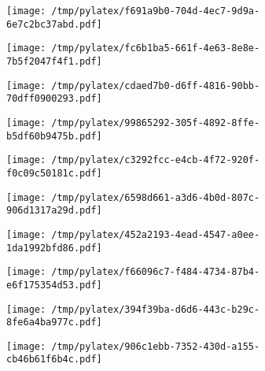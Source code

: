 \documentclass{article}
\begin{document}
\begin{figure}[htbp]
\begin{subfigure}[b]{.3\linewidth}
\texttt{[image: /tmp/pylatex/f691a9b0-704d-4ec7-9d9a-6e7c2bc37abd.pdf]}
\end{subfigure}
\begin{subfigure}[b]{.3\linewidth}
\texttt{[image: /tmp/pylatex/fc6b1ba5-661f-4e63-8e8e-7b5f2047f4f1.pdf]}
\end{subfigure}
\begin{subfigure}[b]{.3\linewidth}
\texttt{[image: /tmp/pylatex/cdaed7b0-d6ff-4816-90bb-70dff0900293.pdf]}
\end{subfigure}
\begin{subfigure}[b]{.3\linewidth}
\texttt{[image: /tmp/pylatex/99865292-305f-4892-8ffe-b5df60b9475b.pdf]}
\end{subfigure}
\begin{subfigure}[b]{.3\linewidth}
\texttt{[image: /tmp/pylatex/c3292fcc-e4cb-4f72-920f-f0c09c50181c.pdf]}
\end{subfigure}
\begin{subfigure}[b]{.3\linewidth}
\texttt{[image: /tmp/pylatex/6598d661-a3d6-4b0d-807c-906d1317a29d.pdf]}
\end{subfigure}
\begin{subfigure}[b]{.3\linewidth}
\texttt{[image: /tmp/pylatex/452a2193-4ead-4547-a0ee-1da1992bfd86.pdf]}
\end{subfigure}
\begin{subfigure}[b]{.3\linewidth}
\texttt{[image: /tmp/pylatex/f66096c7-f484-4734-87b4-e6f175354d53.pdf]}
\end{subfigure}
\begin{subfigure}[b]{.3\linewidth}
\texttt{[image: /tmp/pylatex/394f39ba-d6d6-443c-b29c-8fe6a4ba977c.pdf]}
\end{subfigure}
\begin{subfigure}[b]{.3\linewidth}
\texttt{[image: /tmp/pylatex/906c1ebb-7352-430d-a155-cb46b61f6b4c.pdf]}
\end{subfigure}
\end{figure}
\end{document}

